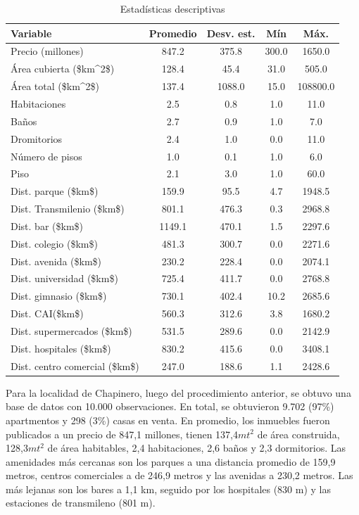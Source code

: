 \documentclass[
  11pt,
  letterpaper,
]{article}
\begin{document}
\begin{table}[!h]
\centering
\caption{\label{tab:descriptive-tbl}Estadísticas descriptivas}
\centering
\begin{tabular}[t]{l|c|c|c|c}
\hline
Variable & Promedio & Desv. est. & Mín & Máx.\\
\hline
Precio (millones) & 847.2 & 375.8 & 300.0 & 1650.0\\
\hline
Área cubierta (\$km\textasciicircum{}2\$) & 128.4 & 45.4 & 31.0 & 505.0\\
\hline
Área total (\$km\textasciicircum{}2\$) & 137.4 & 1088.0 & 15.0 & 108800.0\\
\hline
Habitaciones & 2.5 & 0.8 & 1.0 & 11.0\\
\hline
Baños & 2.7 & 0.9 & 1.0 & 7.0\\
\hline
Dromitorios & 2.4 & 1.0 & 0.0 & 11.0\\
\hline
Número de pisos & 1.0 & 0.1 & 1.0 & 6.0\\
\hline
Piso & 2.1 & 3.0 & 1.0 & 60.0\\
\hline
Dist. parque (\$km\$) & 159.9 & 95.5 & 4.7 & 1948.5\\
\hline
Dist. Transmilenio (\$km\$) & 801.1 & 476.3 & 0.3 & 2968.8\\
\hline
Dist. bar (\$km\$) & 1149.1 & 470.1 & 1.5 & 2297.6\\
\hline
Dist. colegio (\$km\$) & 481.3 & 300.7 & 0.0 & 2271.6\\
\hline
Dist. avenida (\$km\$) & 230.2 & 228.4 & 0.0 & 2074.1\\
\hline
Dist. universidad (\$km\$) & 725.4 & 411.7 & 0.0 & 2768.8\\
\hline
Dist. gimnasio (\$km\$) & 730.1 & 402.4 & 10.2 & 2685.6\\
\hline
Dist. CAI(\$km\$) & 560.3 & 312.6 & 3.8 & 1680.2\\
\hline
Dist. supermercados (\$km\$) & 531.5 & 289.6 & 0.0 & 2142.9\\
\hline
Dist. hospitales (\$km\$) & 830.2 & 415.6 & 0.0 & 3408.1\\
\hline
Dist. centro comercial (\$km\$) & 247.0 & 188.6 & 1.1 & 2428.6\\
\hline
\end{tabular}
\end{table}

Para la localidad de Chapinero, luego del procedimiento anterior, se obtuvo una base de datos con 10.000 observaciones. En total, se obtuvieron 9.702 (97\%) apartmentos y 298 (3\%) casas en venta. En promedio, los inmuebles fueron publicados a un precio de 847,1 millones, tienen 137,4\(mt^2\) de área construida, 128,3\(mt^2\) de área habitables, 2,4 habitaciones, 2,6 baños y 2,3 dormitorios. Las amenidades más cercanas son los parques a una distancia promedio de 159,9 metros, centros comerciales a de 246,9 metros y las avenidas a 230,2 metros. Las más lejanas son los bares a 1,1 km, seguido por los hospitales (830 m) y las estaciones de transmileno (801 m).
\end{document}
